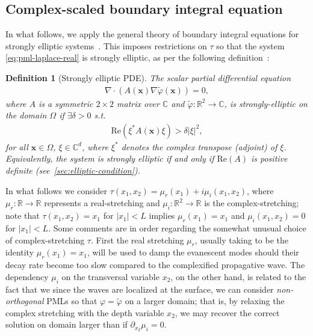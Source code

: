 \documentclass[11pt]{article}
\newcommand{\R}{\mathbb{R}}
\newcommand{\C}{\mathbb{C}}
\newcommand{\bx}{\mathbf{x}}
\newcommand{\tvarphi}{\tilde \varphi}
\newtheorem{definition}[theorem]{Definition}
\begin{document}
\subsection{Complex-scaled boundary integral equation}\label{sec:complex-scaled-bie}

In what follows, we apply the general theory of boundary integral equations for
strongly elliptic systems~\cite{mclean2000strongly}. This imposes restrictions
on $\tau$ so that the system \cref{eq:pml-laplace-real} is strongly elliptic, as
per the following definition~\cite[equation 4.7]{mclean2000strongly}:
\begin{definition}[Strongly elliptic PDE]\label{def:strongly-elliptic}
  The scalar partial differential equation
  \begin{align}
    \nabla \cdot \left( A(\bx) \nabla \tvarphi(\bx) \right) = 0,
  \end{align}
  where $A$ is a symmetric $2 \times 2$ matrix over $\mathbb{C}$ and
  $\tvarphi : \R^2 \to \C$, is strongly-elliptic on the domain $\Omega$
  if $\exists \delta > 0$ s.t.
  \begin{align}
    \mathrm{Re}\left( \xi^* A(\bx) \xi \right) > \delta |\xi|^2,
  \end{align}
  for all $\bx \in \Omega$, $\xi \in \C^{d}$, where $\xi^*$ denotes the complex
  transpose (adjoint) of $\xi$. Equivalently, the system is strongly elliptic if
  and only if $\mathrm{Re}(A)$ is positive definite (see~\cref{sec:elliptic-condition}). 
\end{definition}

%

In what follows we consider $\tau(x_1,x_2) = \mu_r(x_1) + i \mu_i(x_1,x_2)$,
where $\mu_r : \R \to \R$ represents a real-stretching and $\mu_i : \R^2 \to \R$
is the complex-stretching; note that $\tau(x_1,x_2) = x_1$ for $|x_1|<L$ implies
$\mu_r(x_1) = x_1 $ and $\mu_i(x_1,x_2) = 0$ for $|x_1|<L$. Some comments are in
order regarding the somewhat unusual choice of complex-stretching $\tau$. First
the real stretching $\mu_r$, usually taking to be the identity $\mu_r(x_1) =
x_1$, will be used to damp the evanescent modes should their decay rate become
too slow compared to the complexified propagative wave. The dependency $\mu_i$
on the transversal variable $x_2$, on the other hand, is related to the fact
that we since the waves are localized at the surface, we can consider
\emph{non-orthogonal} PMLs so that $\varphi = \tvarphi$ on a larger domain; that
is, by relaxing the complex stretching with the depth variable $x_2$, we may
recover the correct solution on domain larger than if $\partial_{x_2} \mu_i =
0$. 
\end{document}
